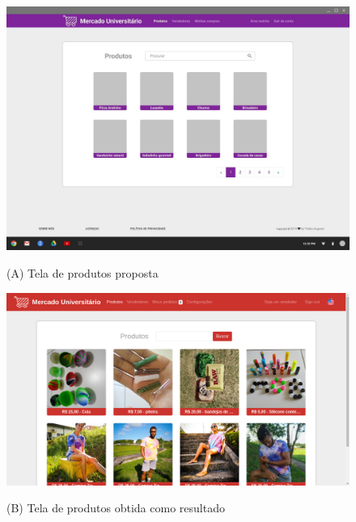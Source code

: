 \begin{figure}[htbp!]
  \centering
  \caption{(A) Tela de produtos proposta}
  \includegraphics[width=1\textwidth]{figs/mockup/produtos.jpg}
    \label{fig:mockup_produtos}
\end{figure}

\begin{figure}[htbp!]
  \centering
  \caption{(B) Tela de produtos obtida como resultado}
  \includegraphics[width=1\textwidth]{figs/resultado/produtos.png}
    \label{fig:real_produtos}
\end{figure}

